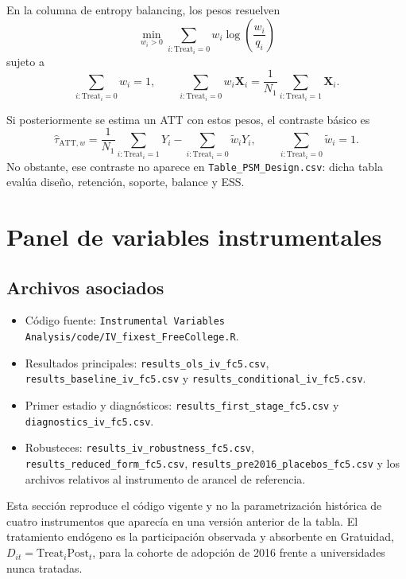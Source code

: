 \documentclass[11pt]{article}
\newcommand{\Treat}{\mathrm{Treat}}
\newcommand{\Post}{\mathrm{Post}}
\newcommand{\ATT}{\mathrm{ATT}}
\newcommand{\file}[1]{\texttt{#1}}
\begin{document}
En la columna de entropy balancing, los pesos resuelven
\begin{equation}
 \min_{w_i>0}\sum_{i:\Treat_i=0}w_i\log\left(\frac{w_i}{q_i}\right)
\end{equation}
sujeto a
\begin{equation}
 \sum_{i:\Treat_i=0}w_i=1,
 \qquad
 \sum_{i:\Treat_i=0}w_i\mathbf X_i
 =\frac{1}{N_1}\sum_{i:\Treat_i=1}\mathbf X_i.
\end{equation}

Si posteriormente se estima un ATT con estos pesos, el contraste básico es
\begin{equation}
 \widehat\tau_{\ATT,w}
 =\frac{1}{N_1}\sum_{i:\Treat_i=1}Y_i
 -\sum_{i:\Treat_i=0}\widetilde w_iY_i,
 \qquad \sum_{i:\Treat_i=0}\widetilde w_i=1.
\end{equation}
No obstante, ese contraste no aparece en \file{Table\_PSM\_Design.csv}: dicha
tabla evalúa diseño, retención, soporte, balance y ESS.

\section{Panel de variables instrumentales}

\subsection*{Archivos asociados}
\begin{itemize}
 \item Código fuente: \file{Instrumental Variables Analysis/code/IV\_fixest\_FreeCollege.R}.
 \item Resultados principales: \file{results\_ols\_iv\_fc5.csv},
       \file{results\_baseline\_iv\_fc5.csv} y
       \file{results\_conditional\_iv\_fc5.csv}.
 \item Primer estadio y diagnósticos: \file{results\_first\_stage\_fc5.csv}
       y \file{diagnostics\_iv\_fc5.csv}.
 \item Robusteces: \file{results\_iv\_robustness\_fc5.csv},
       \file{results\_reduced\_form\_fc5.csv},
       \file{results\_pre2016\_placebos\_fc5.csv} y los archivos relativos
       al instrumento de arancel de referencia.
\end{itemize}

Esta sección reproduce el código vigente y no la parametrización histórica de
cuatro instrumentos que aparecía en una versión anterior de la tabla. El
tratamiento endógeno es la participación observada y absorbente en Gratuidad,
$D_{it}=\Treat_i\Post_t$, para la cohorte de adopción de 2016 frente a
universidades nunca tratadas.
\end{document}
